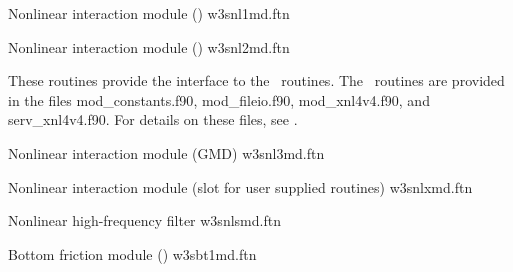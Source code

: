 \noindent
Nonlinear interaction module (\dia) \hfill {\file w3snl1md.ftn}

\begin{flisti}
\end{flisti}

\noindent
Nonlinear interaction module (\xnl) \hfill {\file w3snl2md.ftn}

\begin{flisti}
\end{flisti}
These routines provide the interface to the \xnl\ routines. The \xnl\ routines
are provided in the files {\file mod\_constants.f90}, {\file mod\_fileio.f90},
{\file mod\_xnl4v4.f90}, and {\file serv\_xnl4v4.f90}. For details on these
files, see \cite{rep:vVl02b}.

\vspace{\baselineskip}
\noindent
Nonlinear interaction module (GMD) \hfill {\file w3snl3md.ftn}

\begin{flisti}
\end{flisti}

\vspace{\baselineskip}
\noindent
Nonlinear interaction module (slot for user supplied routines) \hfill {\file
w3snlxmd.ftn}

\begin{flisti}
\end{flisti}

\vspace{\baselineskip}
\noindent
Nonlinear high-frequency filter \hfill {\file w3snlsmd.ftn}

\begin{flisti}
\end{flisti}

\noindent
Bottom friction module (\js) \hfill {\file w3sbt1md.ftn}

\begin{flisti}
\end{flisti}

